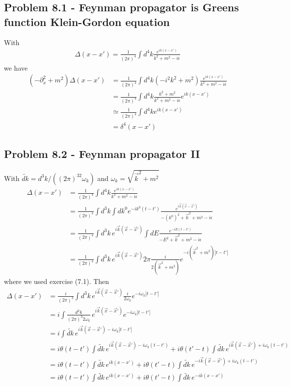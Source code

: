 \documentclass[10pt,a4paper]{book}
\theoremstyle{definition}
\begin{document}
\subsection{Problem 8.1 - Feynman propagator is Greens function Klein-Gordon equation}
With
\begin{align}
\Delta(x-x')=\frac{1}{(2\pi)^4}\int d^4k\frac{e^{ik(x-x')}}{k^2+m^2-i\epsilon}
\end{align}
we have
\begin{align}
(-\partial_x^2+m^2)\Delta(x-x')
&=\frac{1}{(2\pi)^4}\int d^4k(-i^2k^2+m^2)\frac{e^{ik(x-x')}}{k^2+m^2-i\epsilon}\\
&=\frac{1}{(2\pi)^4}\int d^4k\frac{k^2+m^2}{k^2+m^2-i\epsilon}e^{ik(x-x')}\\
&\simeq\frac{1}{(2\pi)^4}\int d^4ke^{ik(x-x')}\\
&=\delta^4(x-x')
\end{align}

\subsection{Problem 8.2 - Feynman propagator II}
With $\widetilde{dk}=d^3k/((2\pi)^32\omega_k)$ and $\omega_k=\sqrt{\vec{k}^2+m^2}$
\begin{align}
\Delta(x-x')
&=\frac{1}{(2\pi)^4}\int d^4k\frac{e^{ik(x-x')}}{k^2+m^2-i\epsilon}\\
&=\frac{1}{(2\pi)^4}\int d^3k\int dk^0e^{-ik^0(t-t')}\frac{e^{i\vec{k}(\vec{x}-\vec{x}')}}{-(k^0)^2+\vec{k}^2+m^2-i\epsilon}\\
&=\frac{1}{(2\pi)^4}\int d^3k\,e^{i\vec{k}(\vec{x}-\vec{x}')}\int dE\frac{e^{-iE(t-t')}}{-E^2+\vec{k}^2+m^2-i\epsilon}\\
&=\frac{1}{(2\pi)^4}\int d^3k\,e^{i\vec{k}(\vec{x}-\vec{x}')}2\pi\frac{i}{2(\vec{k}^2+m^2)}e^{-i(\vec{k}^2+m^2)|t-t'|}
\end{align}
where we used exercise (7.1). Then
\begin{align}
\Delta(x-x')
&=\frac{i}{(2\pi)^3}\int d^3k\,e^{i\vec{k}(\vec{x}-\vec{x}')}\frac{i}{2\omega_k}e^{-i\omega_k|t-t'|}\\
&=i\int\frac{d^3k}{(2\pi)^3 2\omega_k}\,e^{i\vec{k}(\vec{x}-\vec{x}')}e^{-i\omega_k|t-t'|}\\
&=i\int\widetilde{dk}\,e^{i\vec{k}(\vec{x}-\vec{x}')-i\omega_k|t-t'|}\\
&=i\theta(t-t')\int\widetilde{dk}\,e^{i\vec{k}(\vec{x}-\vec{x}')-i\omega_k(t-t')}+i\theta(t'-t)\int\widetilde{dk}\,e^{i\vec{k}(\vec{x}-\vec{x}')+i\omega_k(t-t')}\\
&=i\theta(t-t')\int\widetilde{dk}\,e^{ik(x-x')}+i\theta(t'-t)\int\widetilde{dk}\,e^{-i\vec{k}(\vec{x}-\vec{x}')+i\omega_k(t-t')}\\
&=i\theta(t-t')\int\widetilde{dk}\,e^{ik(x-x')}+i\theta(t'-t)\int\widetilde{dk}\,e^{-ik(x-x')}\\
\end{align}
\end{document}
